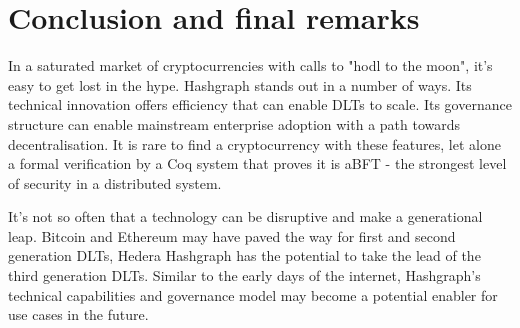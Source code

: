 \section{Conclusion and final remarks}

In a saturated market of cryptocurrencies with calls to "hodl to the moon", it's easy to get lost in the hype. Hashgraph stands out in a number of ways. Its technical innovation offers efficiency that can enable DLTs to scale. Its governance structure can enable mainstream enterprise adoption with a path towards decentralisation. It is rare to find a cryptocurrency with these features, let alone a formal verification by a Coq system that proves it is aBFT - the strongest level of security in a distributed system.

It's not so often that a technology can be disruptive and make a generational leap. Bitcoin and Ethereum may have paved the way for first and second generation DLTs, Hedera Hashgraph has the potential to take the lead of the third generation DLTs. Similar to the early days of the internet, Hashgraph's technical capabilities and governance model may become a potential enabler for use cases in the future.
